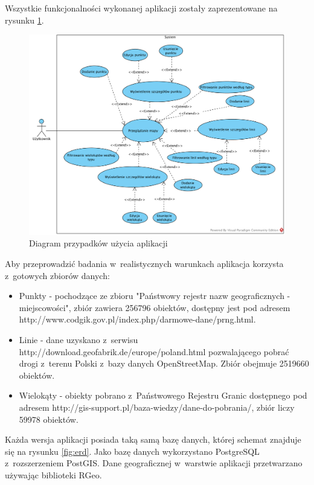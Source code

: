 \documentclass[printmode]{mgr}
\begin{document}
Wszystkie funkcjonalności wykonanej aplikacji zostały zaprezentowane na rysunku \ref{fig:use_cases}.

\begin{figure}[H]
  \centering
  \includegraphics[width=1\linewidth]{pictures/use_cases}
  \caption{Diagram przypadków użycia aplikacji}
  \label{fig:use_cases}
\end{figure}

Aby przeprowadzić badania w~realistycznych warunkach aplikacja korzysta z~gotowych zbiorów danych:
\begin{itemize}
  \item Punkty - pochodzące ze zbioru "Państwowy rejestr nazw geograficznych - miejscowości", zbiór zawiera 256796 obiektów, dostępny jest pod adresem http://www.codgik.gov.pl/index.php/darmowe-dane/prng.html.
  \item Linie - dane uzyskano z~serwisu http://download.geofabrik.de/europe/poland.html pozwalającego pobrać drogi z~terenu Polski z~bazy danych OpenStreetMap. Zbiór obejmuje 2519660 obiektów.
  \item Wielokąty - obiekty pobrano z~Państwowego Rejestru Granic dostępnego pod adresem http://gis-support.pl/baza-wiedzy/dane-do-pobrania/, zbiór liczy 59978 obiektów.
\end{itemize}

Każda wersja aplikacji posiada taką samą bazę danych, której schemat znajduje się na rysunku \ref{fig:erd}. Jako bazę danych wykorzystano PostgreSQL z~rozszerzeniem PostGIS. Dane geograficznej w~warstwie aplikacji przetwarzano używając biblioteki RGeo.
\end{document}
